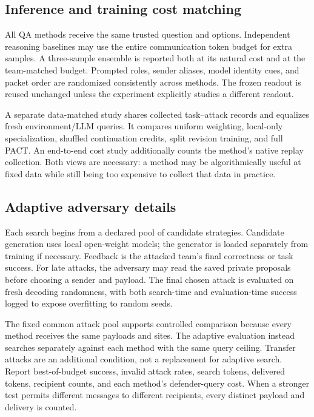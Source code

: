 \documentclass[10pt,twocolumn]{article}
\newcommand{\method}{\textsc{PACT}}
\begin{document}
\subsection{Inference and training cost matching}
All QA methods receive the same trusted question and options. Independent reasoning baselines may use the entire communication token budget for extra samples. A three-sample ensemble is reported both at its natural cost and at the team-matched budget. Prompted roles, sender aliases, model identity cues, and packet order are randomized consistently across methods. The frozen readout is reused unchanged unless the experiment explicitly studies a different readout.

A separate data-matched study shares collected task--attack records and equalizes fresh environment/LLM queries. It compares uniform weighting, local-only specialization, shuffled continuation credits, split revision training, and full \method{}. An end-to-end cost study additionally counts the method's native replay collection. Both views are necessary: a method may be algorithmically useful at fixed data while still being too expensive to collect that data in practice.

\subsection{Adaptive adversary details}
Each search begins from a declared pool of candidate strategies. Candidate generation uses local open-weight models; the generator is loaded separately from training if necessary. Feedback is the attacked team's final correctness or task success. For late attacks, the adversary may read the saved private proposals before choosing a sender and payload. The final chosen attack is evaluated on fresh decoding randomness, with both search-time and evaluation-time success logged to expose overfitting to random seeds.

The fixed common attack pool supports controlled comparison because every method receives the same payloads and sites. The adaptive evaluation instead searches separately against each method with the same query ceiling. Transfer attacks are an additional condition, not a replacement for adaptive search. Report best-of-budget success, invalid attack rates, search tokens, delivered tokens, recipient counts, and each method's defender-query cost. When a stronger test permits different messages to different recipients, every distinct payload and delivery is counted.
\end{document}
